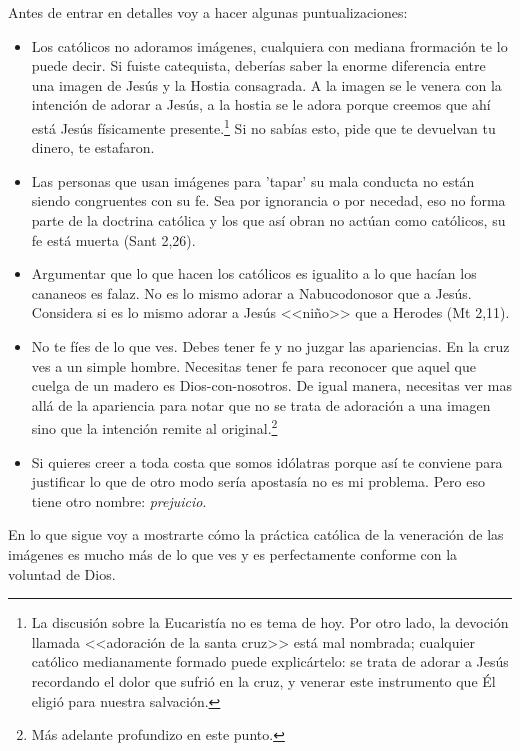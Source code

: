 \documentclass{article}
\begin{document}
\noindent
Antes de entrar en detalles voy a hacer algunas puntualizaciones:

\begin{itemize}
\item Los cat\'olicos no adoramos im\'agenes, cualquiera con mediana frormaci\'on te lo puede decir. Si fuiste catequista, deber\'{i}as saber la enorme diferencia entre una imagen de Jes\'us y la Hostia consagrada. A la imagen se le venera con la intenci\'on de adorar a Jes\'us, a la hostia se le adora porque creemos que ah\'{i} est\'a Jes\'us f\'{i}sicamente presente.\footnote{La discusi\'on sobre la Eucarist\'{i}a no es tema de hoy. Por otro lado, la devoci\'on llamada <<adoraci\'on de la santa cruz>> est\'a mal nombrada; cualquier cat\'olico medianamente formado puede explic\'artelo: se trata de adorar a Jes\'us recordando el dolor que sufri\'o en la cruz, y venerar este instrumento que \'El eligi\'o para nuestra salvaci\'on.} Si no sab\'{i}as esto, pide que te devuelvan tu dinero, te estafaron.

\item Las personas que usan im\'agenes para 'tapar' su mala conducta no est\'an siendo congruentes con su fe. Sea por ignorancia o por necedad, eso no forma parte de la doctrina cat\'olica y los que as\'{i} obran no act\'uan como cat\'olicos, su fe está muerta (Sant 2,26).

\item Argumentar que lo que hacen los cat\'olicos es igualito a lo que hac\'{i}an los cananeos es falaz. No es lo mismo adorar a Nabucodonosor que a Jes\'us. Considera si es lo mismo adorar a Jesús <<ni\~no>> que a Herodes (Mt 2,11).

\item No te f\'{i}es de lo que ves. Debes tener fe y no juzgar las apariencias. En la cruz ves a un simple hombre. Necesitas tener fe para reconocer que aquel que cuelga de un madero es Dios-con-nosotros. De igual manera, necesitas ver mas all\'a de la apariencia para notar que no se trata de adoraci\'on a una imagen sino que la intenci\'on remite al original.\footnote{M\'as adelante profundizo en este punto.}

\item Si quieres creer a toda costa que somos id\'olatras porque as\'{i} te conviene para justificar lo que de otro modo ser\'{i}a apostas\'{i}a no es mi problema. Pero eso tiene otro nombre: \emph{prejuicio}.
\end{itemize}

\noindent
En lo que sigue voy a mostrarte c\'omo la pr\'actica cat\'olica de la veneraci\'on de las im\'agenes es mucho m\'as de lo que ves y es perfectamente conforme con la voluntad de Dios.
\end{document}
